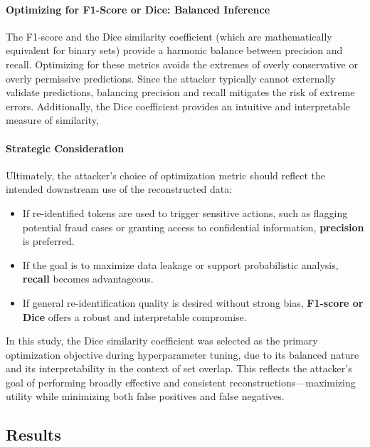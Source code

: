 \paragraph{Optimizing for F1-Score or Dice: Balanced Inference}

The F1-score and the Dice similarity coefficient (which are mathematically equivalent for binary sets) provide a harmonic balance between precision and recall.
Optimizing for these metrics avoids the extremes of overly conservative or overly permissive predictions.
Since the attacker typically cannot externally validate predictions, balancing precision and recall mitigates the risk of extreme errors.
Additionally, the Dice coefficient provides an intuitive and interpretable measure of similarity,

\paragraph{Strategic Consideration}

Ultimately, the attacker’s choice of optimization metric should reflect the intended downstream use of the reconstructed data:

\begin{itemize}
    \item If re-identified tokens are used to trigger sensitive actions, such as flagging potential fraud cases or granting access to confidential information, \textbf{precision} is preferred.
    \item If the goal is to maximize data leakage or support probabilistic analysis, \textbf{recall} becomes advantageous.
    \item If general re-identification quality is desired without strong bias, \textbf{F1-score or Dice} offers a robust and interpretable compromise.
\end{itemize}

In this study, the Dice similarity coefficient was selected as the primary optimization objective during hyperparameter tuning, due to its balanced nature and its interpretability in the context of set overlap.
This reflects the attacker’s goal of performing broadly effective and consistent reconstructions—maximizing utility while minimizing both false positives and false negatives.


\subsection{Results}

